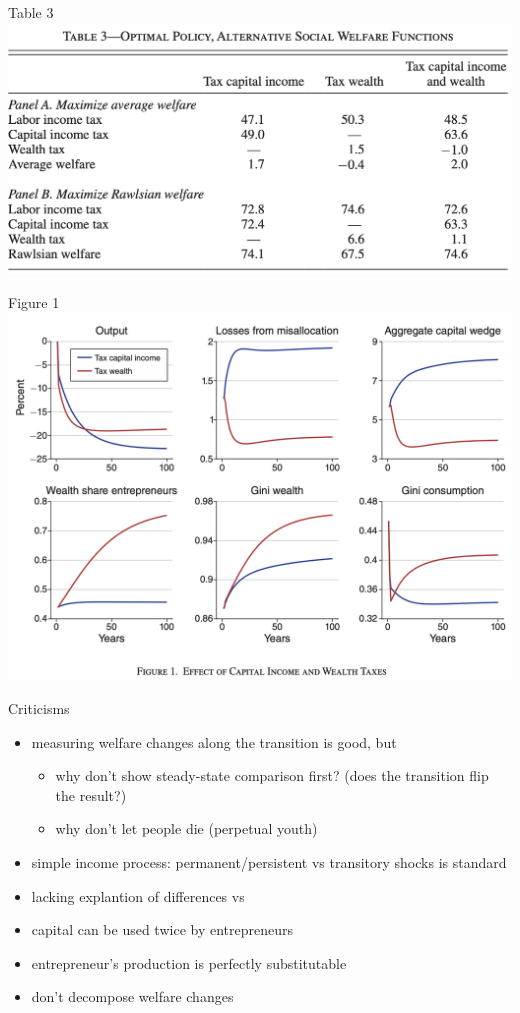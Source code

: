\documentclass[aspectratio=169,mathserif]{beamer}
\begin{document}
\begin{frame}{Table 3}
    \centering
    \includegraphics[scale = 0.6]{BM_Tab_3.png}
\end{frame}

\begin{frame}{Figure 1}
    \centering
    \includegraphics[scale = 0.45]{BM_Fig_1.png}
\end{frame}


\begin{frame}{Criticisms}
    \begin{itemize}
        \item measuring welfare changes along the transition is good, but
        \begin{itemize}
            \item why don't show steady-state comparison first? (does the transition flip the result?)
            \item why don't let people die (perpetual youth)
        \end{itemize}
        \item simple income process: permanent/persistent vs transitory shocks is standard
        \item lacking explantion of differences vs \cite{guvenen2023use}
        \item capital can be used twice by entrepreneurs
        \item entrepreneur's production is perfectly substitutable
        \item don't decompose welfare changes
    \end{itemize}
    
\end{frame}
\end{document}
